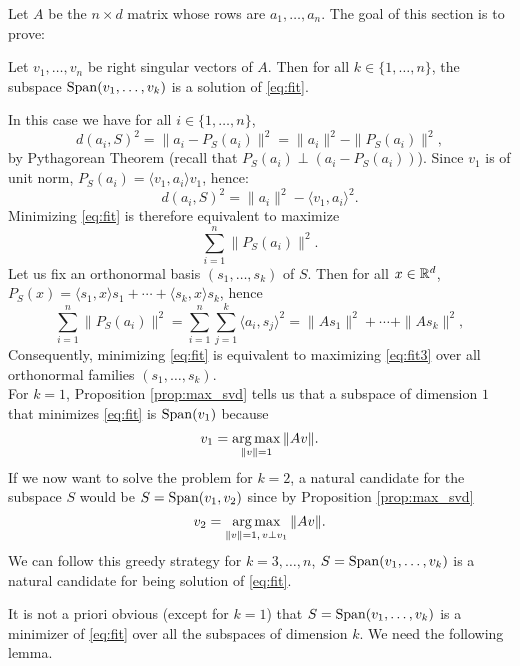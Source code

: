 \documentclass[11pt,nocut]{article}
\begin{document}
Let $A$ be the $n \times d$ matrix whose rows are $a_1, \dots, a_n$.
The goal of this section is to prove:
\begin{theorem}\label{th:approx_svd}
	Let $v_1, \dots, v_n$ be right singular vectors of $A$. Then for all $k \in \{1, \dots, n\}$, the subspace ${{\rm Span}}(v_1, \dots, v_k)$ is a solution of \eqref{eq:fit}.
\end{theorem}
In this case we have for all $i \in \{1, \dots, n\}$,
$$
d(a_i, S)^2 = \| a_i - P_{S}(a_i) \|^2 = \|a_i\|^2 - \| P_{S}(a_i) \|^2,
$$
by Pythagorean Theorem (recall that $P_{S}(a_i) \perp (a_i - P_S(a_i))$). Since $v_1$ is of unit norm, $P_{S}(a_i) = \langle v_1, a_i \rangle v_1$, hence:
$$
d(a_i, S)^2 =  \|a_i\|^2 - \langle v_1, a_i \rangle^2.
$$
Minimizing \eqref{eq:fit} is therefore equivalent to maximize
\begin{equation}\label{eq:fit2}
	\sum_{i=1}^n \| P_{S}(a_i) \|^2.
\end{equation}
Let us fix an orthonormal basis $(s_1, \dots, s_k)$ of $S$. Then for all $x \in \mathbb{R}^d$,
$P_S(x)= \langle s_1, x \rangle s_1 + \cdots + \langle s_k, x \rangle s_k$, hence
\begin{equation}\label{eq:fit3}
	\sum_{i=1}^n \| P_{S}(a_i) \|^2 = \sum_{i=1}^n \sum_{j = 1}^k \langle a_i, s_j \rangle^2
	= \| A s_1 \|^2 + \cdots + \| A s_k \|^2,
\end{equation}
Consequently, minimizing \eqref{eq:fit} is equivalent to maximizing \eqref{eq:fit3} over all orthonormal families $(s_1, \dots, s_k)$.
\\

For $k=1$, Proposition \ref{prop:max_svd} tells us that a subspace of dimension $1$ that minimizes \eqref{eq:fit} is ${{\rm Span}}(v_1)$ because
\begin{equation}\label{eq:def_first_singular}
	v_1 = \operatorname*{arg\,max}_{\|v\| = 1} \|A v\|.
\end{equation}
If we now want to solve the problem for $k=2$, a natural candidate for the subspace $S$ would be $S = {{\rm Span}}(v_1, v_2)$ since by Proposition \ref{prop:max_svd}
\begin{equation}\label{eq:def_second_singular}
	v_2 = \operatorname*{arg\,max}_{\|v\| = 1, \, v \perp v_1} \| A v \|.
\end{equation}
We can follow this greedy strategy for $k = 3, \dots, n$, $S = {{\rm Span}}(v_1, \dots, v_k)$ is a natural candidate for being solution of \eqref{eq:fit}.

It is not a priori obvious (except for $k=1$) that $S = {{\rm Span}}(v_1, \dots, v_k)$ is a minimizer of \eqref{eq:fit} over all the subspaces of dimension $k$.
We need the following lemma.
\end{document}
